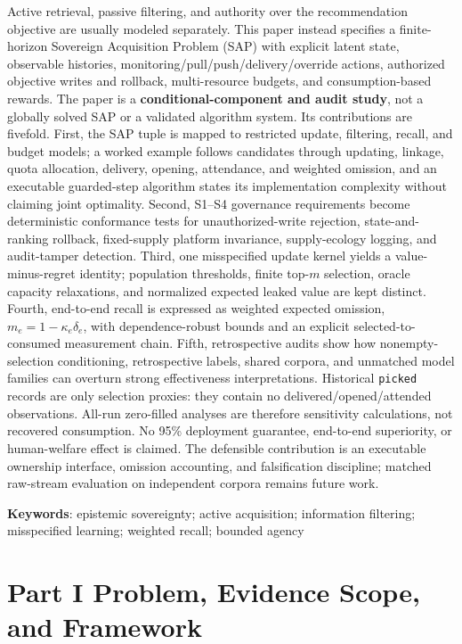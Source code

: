 \documentclass[
  11pt]{article}
\begin{document}
Active retrieval, passive filtering, and authority over the
recommendation objective are usually modeled separately. This paper
instead specifies a finite-horizon Sovereign Acquisition Problem (SAP)
with explicit latent state, observable histories,
monitoring/pull/push/delivery/override actions, authorized objective
writes and rollback, multi-resource budgets, and consumption-based
rewards. The paper is a \textbf{conditional-component and audit study},
not a globally solved SAP or a validated algorithm system. Its
contributions are fivefold. First, the SAP tuple is mapped to restricted
update, filtering, recall, and budget models; a worked example follows
candidates through updating, linkage, quota allocation, delivery,
opening, attendance, and weighted omission, and an executable
guarded-step algorithm states its implementation complexity without
claiming joint optimality. Second, S1--S4 governance requirements become
deterministic conformance tests for unauthorized-write rejection,
state-and-ranking rollback, fixed-supply platform invariance,
supply-ecology logging, and audit-tamper detection. Third, one
misspecified update kernel yields a value-minus-regret identity;
population thresholds, finite top-\(m\) selection, oracle capacity
relaxations, and normalized expected leaked value are kept distinct.
Fourth, end-to-end recall is expressed as weighted expected omission,
\(m_e=1-\kappa_e\delta_e\), with dependence-robust bounds and an
explicit selected-to-consumed measurement chain. Fifth, retrospective
audits show how nonempty-selection conditioning, retrospective labels,
shared corpora, and unmatched model families can overturn strong
effectiveness interpretations. Historical \texttt{picked} records are
only selection proxies: they contain no delivered/opened/attended
observations. All-run zero-filled analyses are therefore sensitivity
calculations, not recovered consumption. No 95\% deployment guarantee,
end-to-end superiority, or human-welfare effect is claimed. The
defensible contribution is an executable ownership interface, omission
accounting, and falsification discipline; matched raw-stream evaluation
on independent corpora remains future work.

\textbf{Keywords}: epistemic sovereignty; active acquisition;
information filtering; misspecified learning; weighted recall; bounded
agency

\newpage
\tableofcontents
\newpage

\section{Part I Problem, Evidence Scope, and
Framework}\label{part-i-problem-evidence-scope-and-framework}
\end{document}
